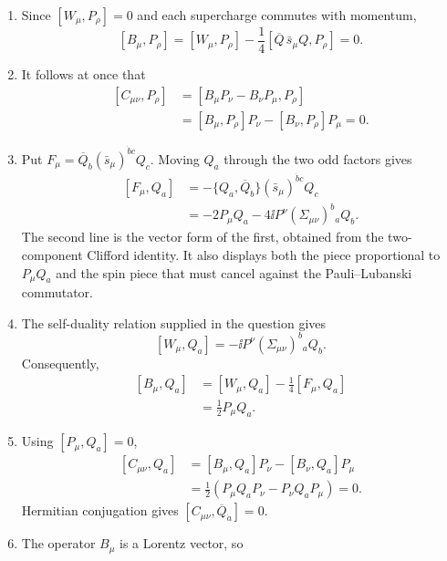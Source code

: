 \begin{enumerate}
  \begin{enumerate}
    \item Since \([W_\mu,P_\rho]=0\) and each supercharge commutes with
      momentum,
      \[
        [B_\mu,P_\rho]
          =[W_\mu,P_\rho]
           -\frac14
             [\overline Q\,\bar s_\mu Q,P_\rho]
          =0.
      \]
    \item It follows at once that
      \[
      \begin{aligned}
        [C_{\mu\nu},P_\rho]
          &=[B_\mu P_\nu-B_\nu P_\mu,P_\rho]\\
          &=[B_\mu,P_\rho]P_\nu
            -[B_\nu,P_\rho]P_\mu=0.
      \end{aligned}
      \]
    \item Put
      \(F_\mu=\overline Q_{\dot b}
        (\bar s_\mu)^{\dot b c}Q_c\).
      Moving \(Q_a\) through the two odd factors gives
      \[
      \begin{aligned}
        [F_\mu,Q_a]
          &=-\{Q_a,\overline Q_{\dot b}\}
              (\bar s_\mu)^{\dot b c}Q_c\\
          &=-2P_\mu Q_a
            -4\ii P^\nu(\Sigma_{\mu\nu})^b{}_aQ_b .
      \end{aligned}
      \]
      The second line is the vector form of the first, obtained from the
      two-component Clifford identity.  It also displays both the piece
      proportional to \(P_\mu Q_a\) and the spin piece that must cancel
      against the Pauli--Lubanski commutator.
    \item The self-duality relation supplied in the question gives
      \[
        [W_\mu,Q_a]
          =-\ii P^\nu(\Sigma_{\mu\nu})^b{}_aQ_b .
      \]
      Consequently,
      \[
      \begin{aligned}
        [B_\mu,Q_a]
          &=[W_\mu,Q_a]-\frac14[F_\mu,Q_a]\\
          &=\frac12P_\mu Q_a .
      \end{aligned}
      \]
    \item Using \([P_\mu,Q_a]=0\),
      \[
      \begin{aligned}
        [C_{\mu\nu},Q_a]
          &=[B_\mu,Q_a]P_\nu-[B_\nu,Q_a]P_\mu\\
          &=\frac12
             \left(P_\mu Q_aP_\nu-P_\nu Q_aP_\mu\right)=0.
      \end{aligned}
      \]
      Hermitian conjugation gives
      \([C_{\mu\nu},\overline Q_{\dot a}]=0\).
    \item The operator \(B_\mu\) is a Lorentz vector, so

\end{enumerate}
\end{enumerate}
